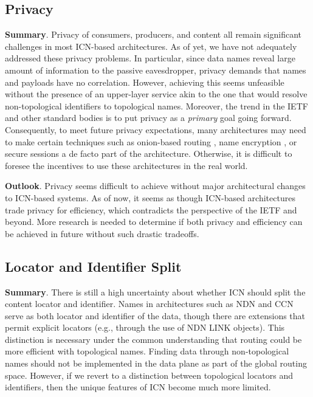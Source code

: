 \subsection{Privacy}
{\bf Summary}. Privacy of consumers, producers, and content all remain significant
challenges in most ICN-based architectures. As of yet, we have not adequately addressed
these privacy problems. In particular, since data names reveal large amount of information to
the passive eavesdropper, privacy demands that names and payloads have no correlation.
However, achieving this seems unfeasible without the presence of an upper-layer service
akin to the one that would resolve non-topological identifiers to topological names.
Moreover, the trend in the IETF and other standard bodies is to put privacy as a \emph{primary} goal going forward. Consequently,
to meet future privacy expectations, many architectures may need to make certain techniques
such as onion-based routing \cite{uzun2011anonymous}, name encryption \cite{privacy}, or secure
sessions \cite{wood-icnrg-ccnxkeyexchange-01} a de facto part of the architecture.
Otherwise, it is difficult to foresee the incentives to use these architectures in the
real world.

{\bf Outlook}. Privacy seems difficult to achieve without major architectural changes to
ICN-based systems. As of now, it seems as though ICN-based architectures trade privacy
for efficiency, which contradicts the perspective of the IETF and beyond. More
research is needed to determine if both privacy and efficiency can be achieved in
future without such drastic tradeoffs.

\subsection{Locator and Identifier Split}
{\bf Summary}. There is still a high uncertainty about whether ICN should split the content
locator and identifier. Names in architectures such as NDN and CCN serve as both
locator and identifier of the data, though there are extensions that permit explicit locators
(e.g., through the use of NDN LINK objects). This distinction is necessary under the common understanding that
routing could be more efficient with topological names. Finding
data through non-topological names should not be implemented in the data plane as part of the global
routing space. However, if we revert to a distinction between topological locators and
identifiers, then the unique features of ICN become much more limited.

